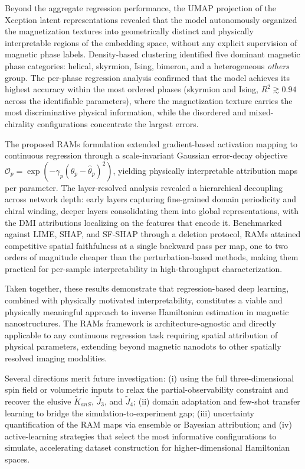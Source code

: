 \documentclass[final,5p,times,twocolumn]{elsarticle}
\begin{document}
Beyond the aggregate regression performance, the UMAP projection of the
Xception latent representations revealed that the model autonomously
organized the magnetization textures into geometrically distinct and
physically interpretable regions of the embedding space, without any
explicit supervision of magnetic phase labels. Density-based clustering
identified five dominant magnetic phase categories: helical, skyrmion,
Ising, bimeron, and a heterogeneous \textit{others} group. The
per-phase regression analysis confirmed that the model achieves its
highest accuracy within the most ordered phases (skyrmion and Ising,
$R^2 \gtrsim 0.94$ across the identifiable parameters), where the
magnetization texture carries the most discriminative physical
information, while the disordered and mixed-chirality configurations
concentrate the largest errors.

The proposed RAMs formulation extended gradient-based activation
mapping to continuous regression through a scale-invariant Gaussian
error-decay objective $\mathcal{O}_p = \exp(-\gamma_p(\theta_p - \hat{\theta}_p)^2)$,
yielding physically interpretable attribution maps per parameter. The
layer-resolved analysis revealed a hierarchical decoupling across
network depth: early layers capturing fine-grained domain periodicity
and chiral winding, deeper layers consolidating them into global
representations, with the DMI attributions localizing on the features
that encode it. Benchmarked against LIME, SHAP, and SF-SHAP through a
deletion protocol, RAMs attained competitive spatial faithfulness at a
single backward pass per map, one to two orders of magnitude cheaper
than the perturbation-based methods, making them practical for
per-sample interpretability in high-throughput characterization.
 
Taken together, these results demonstrate that regression-based deep
learning, combined with physically motivated interpretability,
constitutes a viable and physically meaningful approach to inverse
Hamiltonian estimation in magnetic nanostructures. The RAMs framework
is architecture-agnostic and directly applicable to any continuous
regression task requiring spatial attribution of physical parameters,
extending beyond magnetic nanodots to other spatially resolved imaging
modalities.
 
Several directions merit future investigation: (i) using the full
three-dimensional spin field or
volumetric inputs to relax the partial-observability constraint and
recover the elusive $\tilde{K}_{anS}$, $\tilde{J}_3$, and
$\tilde{J}_4$; (ii) domain adaptation and few-shot transfer learning
to bridge the simulation-to-experiment gap; (iii) uncertainty
quantification of the RAM maps via ensemble or Bayesian attribution;
and (iv) active-learning strategies that select the most informative
configurations to simulate, accelerating dataset construction for
higher-dimensional Hamiltonian spaces.
\end{document}
